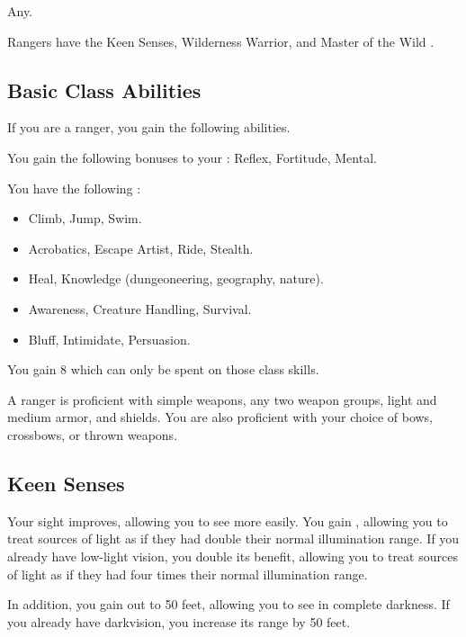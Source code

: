      Any.

     Rangers have the Keen Senses, Wilderness Warrior, and Master of the Wild .

    \subsection{Basic Class Abilities}
        If you are a ranger, you gain the following abilities.

        You gain the following bonuses to your :  Reflex,  Fortitude,  Mental.

        You have the following :
        \begin{itemize}
            \item {} Climb, Jump, Swim.
            \item {} Acrobatics, Escape Artist, Ride, Stealth.
            \item {} Heal, Knowledge (dungeoneering, geography, nature).
            \item {} Awareness, Creature Handling, Survival.
            \item {} Bluff, Intimidate, Persuasion.
        \end{itemize}
        You gain 8  which can only be spent on those class skills.

        A ranger is proficient with simple weapons, any two weapon groups, light and medium armor, and shields.
        You are also proficient with your choice of bows, crossbows, or thrown weapons.

    \subsection{Keen Senses}
        Your sight improves, allowing you to see more easily.
        You gain , allowing you to treat sources of light as if they had double their normal illumination range.
        If you already have low-light vision, you double its benefit, allowing you to treat sources of light as if they had four times their normal illumination range.

        In addition, you gain  out to 50 feet, allowing you to see in complete darkness.
        If you already have darkvision, you increase its range by 50 feet.

